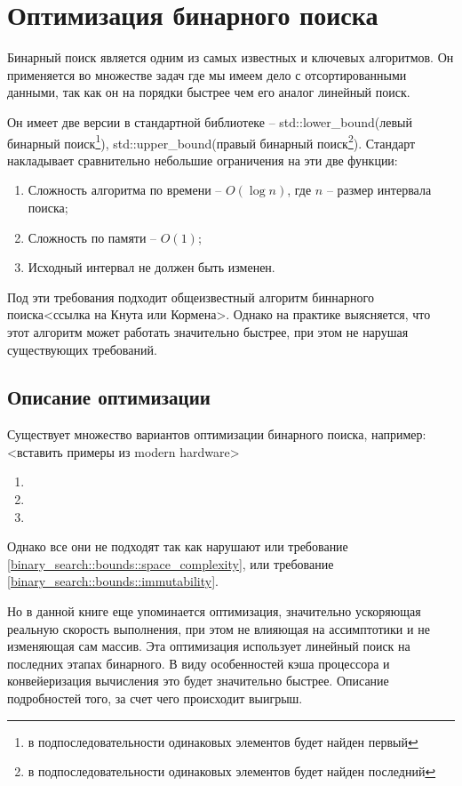 \section{Оптимизация бинарного поиска}\label{binary_search}
\par{Бинарный поиск является одним из самых известных и ключевых алгоритмов. Он применяется во множестве задач где мы имеем дело с отсортированными данными, так как он на порядки быстрее чем его аналог линейный поиск.}
\par{Он имеет две версии в стандартной библиотеке -- std::lower\_bound(левый бинарный поиск\footnote{в подпоследовательности одинаковых элементов будет найден первый}), std::upper\_bound(правый бинарный поиск\footnote{в подпоследовательности одинаковых элементов будет найден последний}). Стандарт накладывает сравнительно небольшие ограничения на эти две функции:
\begin{enumerate}
    \item{Сложность алгоритма по времени -- $O(\log n)$, где $n$ -- размер интервала поиска;}
    \item{Сложность по памяти -- $O(1)$;}\label{binary_search::bounds::space_complexity}
    \item{Исходный интервал не должен быть изменен.}\label{binary_search::bounds::immutability}
\end{enumerate}
Под эти требования подходит общеизвестный алгоритм биннарного поиска<ссылка на Кнута или Кормена>. Однако на практике выясняется, что этот алгоритм может работать значительно быстрее, при этом не нарушая существующих требований. 
}
\subsection{Описание оптимизации}
\par{Существует множество вариантов оптимизации бинарного поиска, например:<вставить примеры из modern hardware>
\begin{enumerate}
    \item{}
    \item{}
    \item{}
\end{enumerate}
Однако все они не подходят так как нарушают или требование \ref{binary_search::bounds::space_complexity}, или требование \ref{binary_search::bounds::immutability}. 
}
\par{Но в данной книге еще упоминается оптимизация, значительно ускоряющая реальную скорость выполнения, при этом не влияющая на ассимптотики и не изменяющая сам массив. Эта оптимизация использует линейный поиск на последних этапах бинарного. В виду особенностей кэша процессора и конвейеризация вычисления это будет значительно быстрее. Описание подробностей того, за счет чего происходит выигрыш.}

